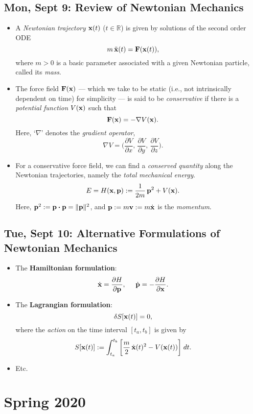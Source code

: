 \documentclass[10pt, oneside]{article}
\newcommand{\R}{\mathbb{R}}
\newcommand{\Cdot}{\boldsymbol{\cdot}}
\begin{document}
\subsection{Mon, Sept 9: Review of Newtonian Mechanics}

\begin{itemize}

	\item  A {\em Newtonian trajectory} ${\bf x}(t)$ ($t \in \R$) is given by solutions of the second order ODE
	      \[ m\, \ddot{{\bf x}}(t) = {\bf F}({\bf x}(t)), \]
	      where $m > 0$ is a basic parameter associated with a given Newtonian particle, called its {\em mass}.

	\item The force field ${\bf F}({\bf x})$ --- which we take to be static (i.e., not intrinsically dependent on time) for simplicity --- is said to be {\em conservative} if there is a {\em potential function} $V({\bf x})$ such that
	      \[ {\bf F}({\bf x}) = -\nabla V({\bf x}). \]
	      Here, `$\nabla$' denotes the {\em gradient operator},
	      \[ \nabla V = \bigg( \frac{\partial V}{\partial x}, \, \frac{\partial V}{\partial y}, \, \frac{\partial V}{\partial z} \bigg). \]

	\item For a conservative force field, we can find a {\em conserved quantity} along the Newtonian trajectories, namely the {\em total mechanical energy}.
	      \[ E = H({\bf x}, {\bf p}) := \frac{1}{2m}\, {\bf p}^2 + V({\bf x}). \]
	      Here, ${\bf p}^2 := {\bf p} \Cdot {\bf p} = \| {\bf p} \|^2$, and ${\bf p} := m {\bf v} := m \dot{{\bf x}}$ is the {\em momentum}.

\end{itemize}

\subsection{Tue, Sept 10: Alternative Formulations of Newtonian Mechanics}

\begin{itemize}

	\item The {\bf Hamiltonian formulation}:
	      \[ \dot{{\bf x}} = \frac{\partial H}{\partial {\bf p}}, \;\;\;\;\; \dot{{\bf p}} = - \frac{\partial H}{\partial {\bf x}}. \]

	\item The {\bf Lagrangian formulation}:
	      \[ \delta S[{\bf x}(t)] = 0, \]
	      where the {\em action} on the time interval $[t_a, t_b]$ is given by
	      \[ S[{\bf x}(t)] := \int_{t_a}^{t_b} \bigg[ \frac{m}{2} \, \dot{{\bf x}}(t)^2 - V({\bf x}(t)) \bigg]  \; dt. \]

	\item Etc.

\end{itemize}


\section{Spring 2020}
\end{document}

